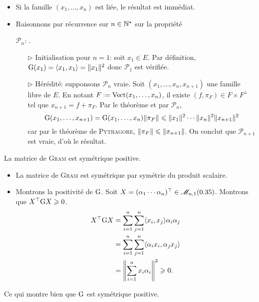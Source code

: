 \begin{preuve}
    \begin{itemize}
        \item Si la famille $(x_1, \dots, x_n)$ est liée, le résultat est immédiat.
        \item Raisonnons par récurrence sur $n \in \mathbb{N}^\star$ sur la propriété
        \begin{center}
            $\mathscr{P}_n$: .
        \end{center}
        \begin{itemize}
            \item[$\rhd$] Initialisation pour $n = 1$: soit $x_1 \in E$. Par définition, $\mathrm{G}(x_1) = \langle x_1, x_1 \rangle = \Vert x_1 \Vert^2$ donc $\mathscr{P}_1$ est vérifiée.
            \item[$\rhd$] Hérédité: supponsons $\mathscr{P}_n$ vraie. Soit $(x_1, \dots, x_n, x_{n+1})$ une famille libre de $E$. En notant $F \defeq \Vect(x_1, \dots, x_n)$, il existe $(f, \pi_F) \in F \times F^\perp$ tel que $x_{n+1} = f + \pi_F$. Par le théorème  et par $\mathscr{P}_n$, 
            $$\mathrm{G}(x_1, \dots, x_{n+1}) = \mathrm{G}(x_1, \dots, x_n) \Vert \pi_F \Vert \leqslant \Vert x_1 \Vert^2 \cdots \Vert x_n \Vert^2 \Vert x_{n+1} \Vert^2$$
            car par le théorème de \textsc{Pythagore}, $\Vert \pi_F \Vert \leqslant \Vert x_{n+1} \Vert$. On conclut que $\mathscr{P}_{n+1}$ est vraie, d'où le résultat. 
        \end{itemize}
    \end{itemize}
\end{preuve}

\begin{prop}{}
    La matrice de \textsc{Gram} est symétrique positive.
\end{prop}

\begin{preuve}
    \begin{itemize}
        \item La matrice de \textsc{Gram} est symétrique par symétrie du produit scalaire.
        \item Montrons la positivité de $\mathrm{G}$. Soit $X = (\alpha_1 \cdots \alpha_n)^\top \in \mathscr{M}_{n,1}(0.35)$. Montrons que $X^\top \mathrm{G} X \geqslant 0$. 
        \begin{align*}
            X^\top \mathrm{G} X &= \sum_{i=1}^{n} \sum_{j=1}^{n} \langle x_i, x_j \rangle \alpha_i \alpha_j \\ 
            &= \sum_{i=1}^{n} \sum_{j=1}^{n} \langle \alpha_i x_i, \alpha_j x_j \rangle \\
            &= \left\Vert \sum_{i=1}^{n}x_i \alpha_i \right\Vert^2 \geqslant 0.
        \end{align*}
    \end{itemize}
   
    Ce qui montre bien que $\mathrm{G}$ est symétrique positive.
\end{preuve}

